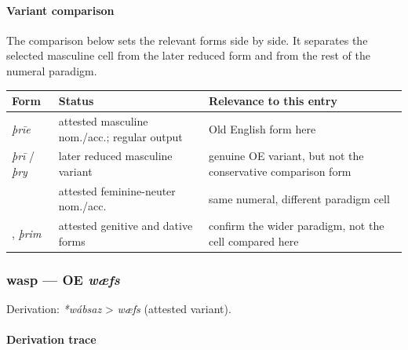 \documentclass[
  british,
  a4paper,
]{article}
\newcounter{none} %
\begin{document}
\paragraph{Variant comparison}\label{variant-comparison-2}

The comparison below sets the relevant forms side by side. It separates
the selected masculine cell from the later reduced form and from the
rest of the numeral paradigm.

{\def\LTcaptype{none} %
\begin{longtable}[]{@{}
  >{\raggedright\arraybackslash}p{}
  >{\raggedright\arraybackslash}p{}
  >{\raggedright\arraybackslash}p{}@{}}
\toprule\noalign{}
\begin{minipage}[b]{\linewidth}\raggedright
Form
\end{minipage} & \begin{minipage}[b]{\linewidth}\raggedright
Status
\end{minipage} & \begin{minipage}[b]{\linewidth}\raggedright
Relevance to this entry
\end{minipage} \\
\midrule\noalign{}
\endhead
\bottomrule\noalign{}
\endlastfoot
{\emph{þrīe}} & attested masculine nom./acc.; regular output & Old
English form here \\
\emph{þrī} / \emph{þry} & later reduced masculine variant & genuine OE
variant, but not the conservative comparison form \\
{\emph{þrēo}} & attested feminine-neuter nom./acc. & same numeral,
different paradigm cell \\
{\emph{þrēora}}, {\emph{þrim}} & attested genitive and dative forms &
confirm the wider paradigm, not the cell compared here \\
\end{longtable}
}

\subsubsection{\texorpdfstring{wasp --- OE
\emph{wæfs}}{wasp --- OE wæfs}}\label{wasp-oe-wuxe6fs}

Derivation: \emph{*wábsaz} \textgreater{} \emph{wæfs} (attested
variant).

\paragraph{Derivation trace}\label{derivation-trace-85}
\end{document}
